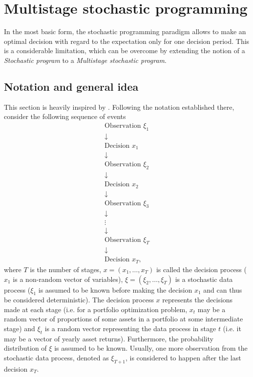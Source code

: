 \section{Multistage stochastic programming}
In the most basic form, the stochastic programming paradigm allows to make an optimal decision with regard to the expectation only for one decision period. This is a considerable limitation, which can be overcome by extending the notion of a \textit{Stochastic program} to a \textit{Multistage stochastic program}.

\subsection{Notation and general idea}
This section is heavily inspired by \cite[Section 3.3.]{stochasticprogrammingbible}.
Following the notation established there, consider the following sequence of events
\begin{equation*}
\begin{gathered}
\mathrm{Observation} \,\, \xi_1
\\
\downarrow
\\
\mathrm{Decision} \, \, x_1
\\
\downarrow
\\
\mathrm{Observation} \,\, \xi_2
\\
\downarrow
\\
\mathrm{Decision} \,\, x_2
\\
\downarrow
\\
\mathrm{Observation} \,\, \xi_3
\\
\downarrow
\\
\vdots
\\
\downarrow
\\
\mathrm{Observation} \,\, \xi_T
\\
\downarrow
\\
\mathrm{Decision} \,\, x_T,
\end{gathered}
\end{equation*}
where $T$ is the number of stages, $x=(x_1,\dots,x_T)$ is called the decision process ($x_1$ is a non-random vector of variables), $\xi = (\xi_2,\dots,\xi_{T})$ is a stochastic data process ($\xi_1$ is assumed to be known before making the decision $x_1$ and can thus be considered deterministic).  The decision process $x$ represents the decisions made at each stage (i.e. for a portfolio optimization problem, $x_t$ may be a random vector of proportions of some assets in a portfolio at some intermediate stage) and $\xi_{t}$ is a random vector representing the data process in stage $t$ (i.e. it may be a vector of yearly asset returns). Furthermore, the probability distribution of $\xi$ is assumed to be known. Usually, one more observation from the stochastic data process, denoted as $\xi_{T+1}$, is considered to happen after the last decision $x_T$.
